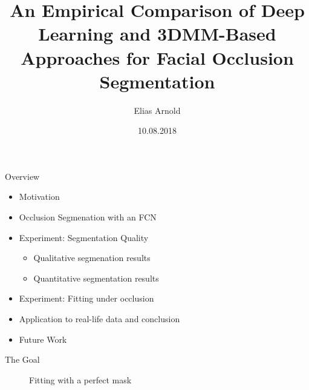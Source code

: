 \documentclass{beamer}
\title              {An Empirical Comparison of Deep Learning and 3DMM-Based Approaches for Facial Occlusion Segmentation}
\author             {Elias Arnold}
\institute          {Department of Mathematics and Computer Science, University of Basel}
\date               {10.08.2018}
\begin{document}
		
\begin{frame}[t,plain]
\titlepage
\end{frame}


\begin{frame}[c]{Overview}
	\begin{itemize}
		\item Motivation
		\item Occlusion Segmenation with an FCN
		\item Experiment: Segmentation Quality
		\begin{itemize}
			\item Qualitative segmenation results
			\item Quantitative segmentation results
		\end{itemize}
		\item Experiment: Fitting under occlusion
		\item Application to real-life data and conclusion
		\item Future Work
	\end{itemize}
\end{frame}


\begin{frame}[c]{The Goal}
	\begin{figure}
		\centering
		\qquad
		\qquad
		\caption{Fitting with a perfect mask}
		\label{fig:1}
	\end{figure}
\end{frame}
\end{document}
